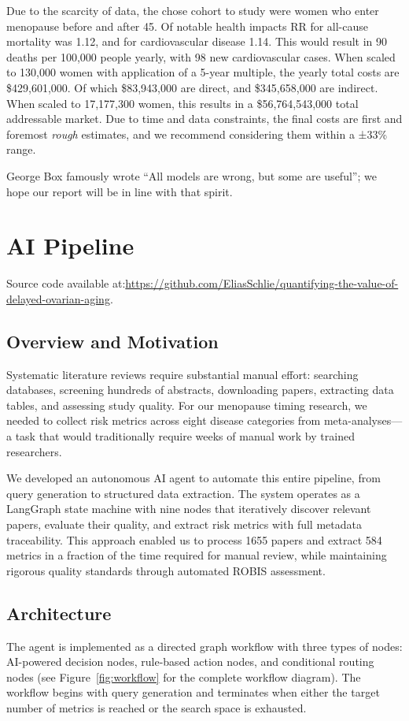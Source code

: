 \documentclass[12pt]{article}
\begin{document}
Due to the scarcity of data, the chose cohort to study were women who enter menopause before and after 45. Of notable health impacts RR for all-cause mortality was 1.12, and for cardiovascular disease 1.14. This would result in 90 deaths per 100,000 people yearly, with 98 new cardiovascular cases. When scaled to 130,000 women with application of a 5-year multiple, the yearly total costs are \$429,601,000. Of which \$83,943,000 are direct, and \$345,658,000 are indirect. When scaled to 17,177,300 women, this results in a \$56,764,543,000 total addressable market. Due to time and data constraints, the final costs are first and foremost \textit{rough} estimates, and we recommend considering them within a ±33\% range.

George Box famously wrote ``All models are wrong, but some are useful''; we hope our report will be in line with that spirit.

\newpage
\section{AI Pipeline}
Source code available at:\newline \url{https://github.com/EliasSchlie/quantifying-the-value-of-delayed-ovarian-aging}.
\subsection{Overview and Motivation}
Systematic literature reviews require substantial manual effort: searching databases, screening hundreds of abstracts, downloading papers, extracting data tables, and assessing study quality. For our menopause timing research, we needed to collect risk metrics across eight disease categories from meta-analyses—a task that would traditionally require weeks of manual work by trained researchers.

We developed an autonomous AI agent to automate this entire pipeline, from query generation to structured data extraction. The system operates as a LangGraph state machine with nine nodes that iteratively discover relevant papers, evaluate their quality, and extract risk metrics with full metadata traceability. This approach enabled us to process 1655 papers and extract 584 metrics in a fraction of the time required for manual review, while maintaining rigorous quality standards through automated ROBIS assessment.

\subsection{Architecture}
The agent is implemented as a directed graph workflow with three types of nodes: AI-powered decision nodes, rule-based action nodes, and conditional routing nodes (see Figure~\ref{fig:workflow} for the complete workflow diagram). The workflow begins with query generation and terminates when either the target number of metrics is reached or the search space is exhausted.
\end{document}
